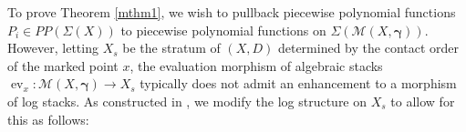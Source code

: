 \documentclass[12pt, oneside]{amsart}   	%
\newcounter{thm}
\newcommand{\ev}{\operatorname{ev}}
\numberwithin{equation}{section}
\numberwithin{thm}{section}
\numberwithin{figure}{section}
\begin{document}






To prove Theorem \ref{mthm1}, we wish to pullback piecewise polynomial functions $P_i \in PP(\Sigma(X))$ to piecewise polynomial functions on $\Sigma(\mathscr{M}(X,\pmb\gamma))$. However, letting $X_s$ be the stratum of $(X,D)$ determined by the contact order of the marked point $x$, the evaluation morphism of algebraic stacks $\ev_x: \mathscr{M}(X,\pmb\gamma) \rightarrow X_s$ typically does not admit an enhancement to a morphism of log stacks. As constructed in \cite{DRtoric}, we modify the log structure on $X_s$ to allow for this as follows: 
\end{document}
